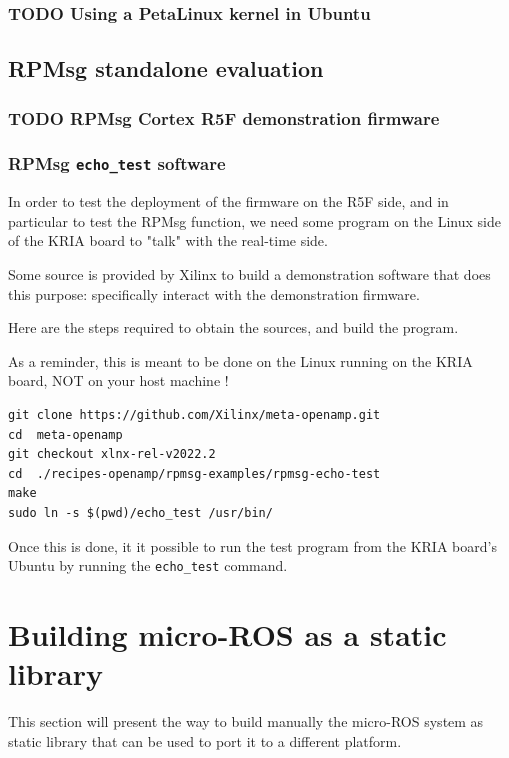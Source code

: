 \documentclass[10pt]{article}
\begin{document}
\subsubsection{{\bfseries\sffamily TODO} Using a PetaLinux kernel in Ubuntu}
\label{sec:orgf79eb3a}

\subsection{RPMsg standalone evaluation}
\label{sec:org482905f}
\subsubsection{{\bfseries\sffamily TODO} RPMsg Cortex R5F demonstration firmware}
\label{sec:orga556564}
\subsubsection{RPMsg \texttt{echo\_test} software}
\label{sec:orgb8b5a94}
In order to test the deployment of the firmware on the R5F side, and in particular
to test the RPMsg function, we need some program on the Linux side of the KRIA
board to "talk" with the real-time side.

Some source is provided by Xilinx to build a demonstration software that does
this purpose: specifically interact with the demonstration firmware.

Here are the steps required to obtain the sources, and build the program.

As a reminder, this is meant to be done on the Linux running on the
KRIA board, NOT on your host machine !

\begin{verbatim}
git clone https://github.com/Xilinx/meta-openamp.git
cd  meta-openamp
git checkout xlnx-rel-v2022.2
cd  ./recipes-openamp/rpmsg-examples/rpmsg-echo-test
make
sudo ln -s $(pwd)/echo_test /usr/bin/
\end{verbatim}

Once this is done, it it possible to run the test program from the KRIA board's Ubuntu
by running the \texttt{echo\_test} command.
\section{Building micro-ROS as a static library}
\label{sec:org4aa5456}
This section will present the way to build manually the micro-ROS system as static library
that can be used to port it to a different platform.
\end{document}
